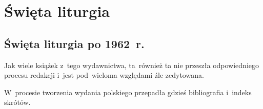 \documentclass[a4paper,11pt]{article}
\begin{document}
\newpage

\section{Święta liturgia}

\vspace{\spaceTwo}



\subsection{Święta liturgia po 1962~r.}

\vspace{\spaceThree}




\vspace{0em}



\vspace{0em}


\noindent
Jak wiele książek z~tego wydawnictwa, ta~również ta nie przeszła
odpowiedniego procesu redakcji i~jest pod~wieloma względami źle zedytowana.

\vspace{\spaceFour}





\noindent
W~procesie tworzenia wydania polskiego przepadła gdzieś bibliografia
i~indeks skrótów.





\newpage


\vspace{\spaceFive}
\end{document}
